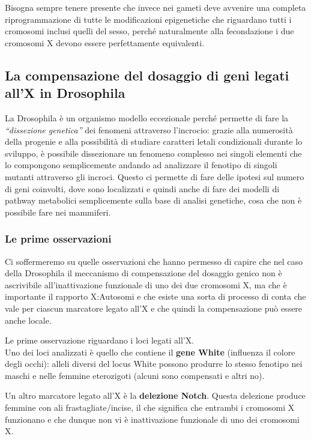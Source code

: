 \documentclass[11pt]{book}
\begin{document}
Bisogna sempre tenere presente che invece nei gameti deve avvenire una completa riprogrammazione di tutte le modificazioni epigenetiche che riguardano tutti i cromosomi inclusi quelli del sesso, perché naturalmente alla fecondazione i due cromosomi X devono essere perfettamente equivalenti.

\subsection{La compensazione del dosaggio di geni legati all'X in Drosophila}
La Drosophila è un organismo modello eccezionale perché permette di fare la \emph{``dissezione genetica''} dei fenomeni attraverso l’incrocio: grazie alla numerosità della progenie e alla possibilità di studiare caratteri letali condizionali durante lo sviluppo, è possibile dissezionare un fenomeno complesso nei singoli elementi che lo compongono semplicemente andando ad analizzare il fenotipo di singoli mutanti attraverso gli incroci. Questo ci permette di fare delle ipotesi sul numero di geni coinvolti, dove sono localizzati e quindi anche di fare dei modelli di pathway metabolici semplicemente sulla base di analisi genetiche, cosa che non è possibile fare nei mammiferi.

    
\subsubsection{Le prime osservazioni}
Ci soffermeremo su quelle osservazioni che hanno permesso di capire che nel caso della Drosophila il meccanismo di compensazione del dosaggio genico non è ascrivibile all’inattivazione funzionale di uno dei due cromosomi X, ma che è importante il rapporto X:Autosomi e che esiste una sorta di processo di conta che vale per ciascun marcatore legato all’X e che quindi la compensazione può essere anche locale.

Le prime osservazione riguardano i loci legati all’X.\\
Uno dei loci analizzati è quello che contiene il \textbf{gene White} (influenza il colore degli occhi): alleli diversi del locus White possono produrre lo stesso fenotipo nei maschi e nelle femmine eterozigoti (alcuni sono compensati e altri no).

Un altro marcatore legato all’X è la \textbf{delezione Notch}. Questa delezione produce femmine con ali frastagliate/incise, il che significa che entrambi i cromosomi X funzionano e che dunque non vi è inattivazione funzionale di uno dei cromosomi X.
 
\end{document}
